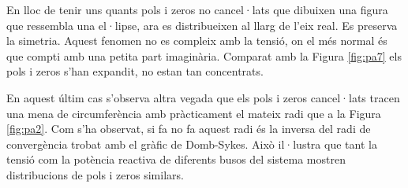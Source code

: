 En lloc de tenir uns quants pols i zeros no cancel·lats que dibuixen una figura que ressembla una el·lipse, ara es distribueixen al llarg de l'eix real. Es preserva la simetria. Aquest fenomen no es compleix amb la tensió, on el més normal és que compti amb una petita part imaginària. Comparat amb la Figura \ref{fig:pa7} els pols i zeros s'han expandit, no estan tan concentrats.

En aquest últim cas s'observa altra vegada que els pols i zeros cancel·lats tracen una mena de circumferència amb pràcticament el mateix radi que a la Figura \ref{fig:pa2}. Com s'ha observat, si fa no fa aquest radi és la inversa del radi de convergència trobat amb el gràfic de Domb-Sykes. Això il·lustra que tant la tensió com la potència reactiva de diferents busos del sistema mostren distribucions de pols i zeros similars.



